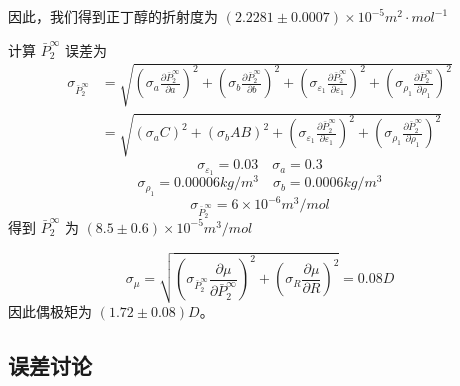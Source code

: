 \documentclass[cn,hazy,pku,12pt,normal,math=newtx,cite=super]{elegantnote}
\begin{document}
因此，我们得到正丁醇的折射度为 $(2.2281 \pm 0.0007) \times 10^{-5} m^2\cdot mol^{-1}$

计算 $\bar{P}_2^\infty$ 误差为
\begin{equation*}
    \begin{aligned}
        \sigma_{\bar{P}_2^\infty} &= \sqrt{(\sigma_a \frac{\partial \bar{P}_2^\infty}{\partial a})^2+(\sigma_b \frac{\partial \bar{P}_2^\infty}{\partial b})^2+(\sigma_{\varepsilon_1} \frac{\partial \bar{P}_2^\infty}{\partial \varepsilon_1})^2+(\sigma_{\rho_1} \frac{\partial \bar{P}_2^\infty}{\partial \rho_1})^2} \\
                                  &= \sqrt{(\sigma_a C)^2+(\sigma_b AB)^2+(\sigma_{\varepsilon_1} \frac{\partial \bar{P}_2^\infty}{\partial \varepsilon_1})^2+(\sigma_{\rho_1} \frac{\partial \bar{P}_2^\infty}{\partial \rho_1})^2}
    \end{aligned}
\end{equation*}
$$
\sigma_{\varepsilon_1} = 0.03 \quad \sigma_a =  0.3
$$
$$
\sigma_{\rho_1} = 0.00006 kg/m^3 \quad \sigma_b = 0.0006 kg/m^3
$$
$$
\sigma_{\bar{P}_2^\infty} = 6 \times 10^{-6} m^3/mol
$$
得到 $\bar{P}_2^\infty$ 为 $(8.5 \pm 0.6) \times 10^{-5}m^3/mol$

$$
\sigma_\mu = \sqrt{(\sigma_{\bar{P}_2^\infty} \frac{\partial \mu}{\partial \bar{P}_2^\infty})^2+(\sigma_R \frac{\partial \mu}{\partial R})^2} = 0.08 D
$$
因此偶极矩为 $(1.72 \pm 0.08) D$。

\subsection{误差讨论}
\end{document}
